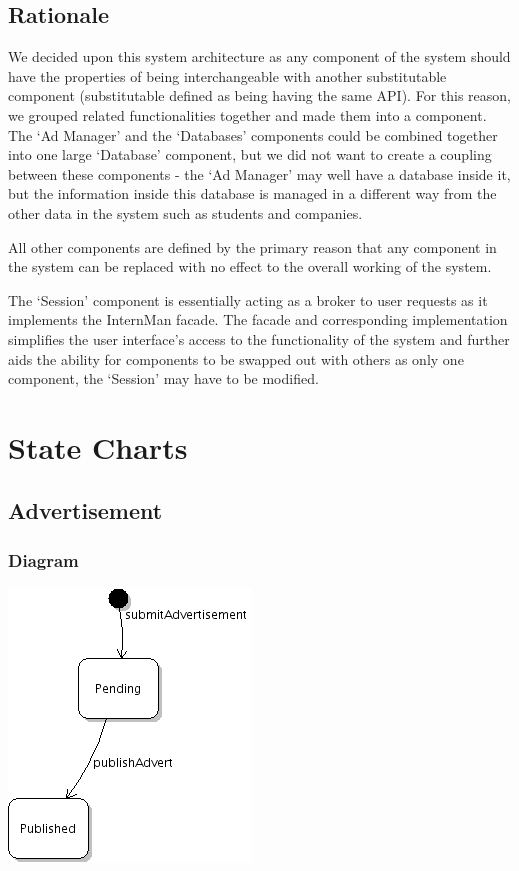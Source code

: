 \documentclass[11pt]{l3deliverable}
\begin{document}
\subsection{Rationale}

We decided upon this system architecture as any component of the system should 
have the properties of being interchangeable with another substitutable 
component (substitutable defined as being having the same API). For this reason, 
we grouped related functionalities together and made them into a component. 
The `Ad Manager' and the `Databases' components could be combined together 
into one large `Database' component, but we did not want to create a coupling 
between these components - the `Ad Manager' may well have a database inside 
it, but the information inside this database is managed in a different way from 
the other data in the system such as students and companies.

All other components are defined by the primary reason that any component in the 
system can be replaced with no effect to the overall working of the system.

The `Session' component is essentially acting as a broker to user requests as
it implements the InternMan facade. The facade and corresponding implementation 
simplifies the user interface's access to the functionality of the system and 
further aids the ability for components to be swapped out with others as only 
one component, the `Session' may have to be modified.

\newpage

\section{State Charts}

\subsection{Advertisement}

\subsubsection{Diagram}

\includegraphics{advertState.png}
\end{document}
